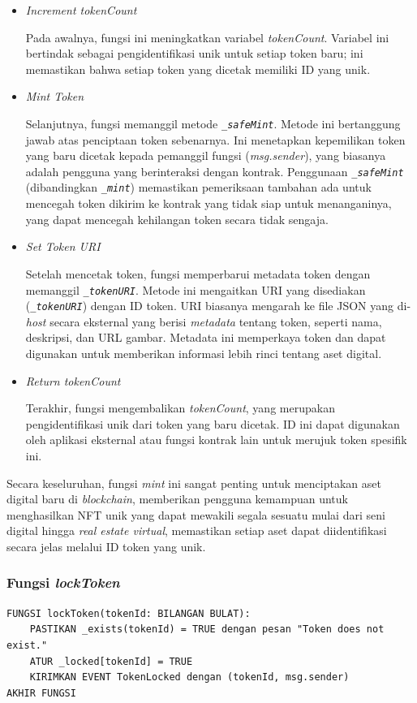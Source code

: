 \begin{itemize}
    \item \emph{Increment tokenCount}
    
    Pada awalnya, fungsi ini meningkatkan variabel \emph{tokenCount}. Variabel ini bertindak sebagai pengidentifikasi unik untuk setiap token baru; ini memastikan bahwa setiap token yang dicetak memiliki ID yang unik.

    \item \emph{Mint Token}
    
    Selanjutnya, fungsi memanggil metode \emph{\texttt{\_safeMint}}. Metode ini bertanggung jawab atas penciptaan token sebenarnya. Ini menetapkan kepemilikan token yang baru dicetak kepada pemanggil fungsi (\emph{msg.sender}), yang biasanya adalah pengguna yang berinteraksi dengan kontrak. Penggunaan \emph{\texttt{\_safeMint}} (dibandingkan \emph{\texttt{\_mint}}) memastikan pemeriksaan tambahan ada untuk mencegah token dikirim ke kontrak yang tidak siap untuk menanganinya, yang dapat mencegah kehilangan token secara tidak sengaja.

    \item \emph{Set Token URI}
    
    Setelah mencetak token, fungsi memperbarui metadata token dengan memanggil \emph{\texttt{\_tokenURI}}. Metode ini mengaitkan URI yang disediakan (\emph{\texttt{\_tokenURI}}) dengan ID token. URI biasanya mengarah ke file JSON yang di-\emph{host} secara eksternal yang berisi \emph{metadata} tentang token, seperti nama, deskripsi, dan URL gambar. Metadata ini memperkaya token dan dapat digunakan untuk memberikan informasi lebih rinci tentang aset digital.

    \item \emph{Return tokenCount}
    
    Terakhir, fungsi mengembalikan \emph{tokenCount}, yang merupakan pengidentifikasi unik dari token yang baru dicetak. ID ini dapat digunakan oleh aplikasi eksternal atau fungsi kontrak lain untuk merujuk token spesifik ini.
\end{itemize}

Secara keseluruhan, fungsi \emph{mint} ini sangat penting untuk menciptakan aset digital baru di \emph{blockchain}, memberikan pengguna kemampuan untuk menghasilkan NFT unik yang dapat mewakili segala sesuatu mulai dari seni digital hingga \emph{real estate virtual}, memastikan setiap aset dapat diidentifikasi secara jelas melalui ID token yang unik.
    
\subsubsection{Fungsi \emph{lockToken}}
\begin{lstlisting}[caption=Fungsi lockToken]
FUNGSI lockToken(tokenId: BILANGAN BULAT):
    PASTIKAN _exists(tokenId) = TRUE dengan pesan "Token does not exist."
    ATUR _locked[tokenId] = TRUE
    KIRIMKAN EVENT TokenLocked dengan (tokenId, msg.sender)
AKHIR FUNGSI
\end{lstlisting}

